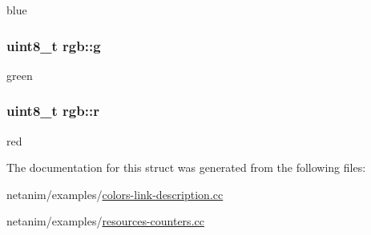 blue 

\subsubsection[{\texorpdfstring{g}{g}}]{\setlength{\rightskip}{0pt plus 5cm}uint8\+\_\+t rgb\+::g}\hypertarget{structrgb_a644713f43fbcf5e9f070fa1843aee55f}{}\label{structrgb_a644713f43fbcf5e9f070fa1843aee55f}


green 

\subsubsection[{\texorpdfstring{r}{r}}]{\setlength{\rightskip}{0pt plus 5cm}uint8\+\_\+t rgb\+::r}\hypertarget{structrgb_afd9a3feaf22de2f96ba25d19494235a6}{}\label{structrgb_afd9a3feaf22de2f96ba25d19494235a6}


red 



The documentation for this struct was generated from the following files\+:\begin{DoxyCompactItemize}
\item 
netanim/examples/\hyperlink{colors-link-description_8cc}{colors-\/link-\/description.\+cc}\item 
netanim/examples/\hyperlink{resources-counters_8cc}{resources-\/counters.\+cc}\end{DoxyCompactItemize}
